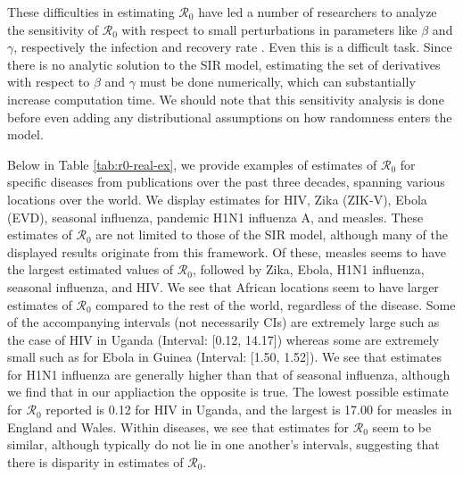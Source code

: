 \documentclass[12pt]{article}
\newcommand{\rr}{\ensuremath{\mathcal{R}_0}}
\begin{document}
These difficulties in estimating $\rr$ have led a number of researchers to analyze the sensitivity of $\rr$ with respect to small perturbations in parameters like $\beta$ and $\gamma$, respectively the infection and recovery rate \citep{lash2003,epstein2007agent,capaldi2012}.  Even this is a difficult task. Since there is no analytic solution to the SIR model, estimating the set of derivatives with respect to $\beta$ and $\gamma$ must be done numerically, which can substantially increase computation time.  We should note that this sensitivity analysis is done before even adding any distributional assumptions on how randomness enters the model.

Below in Table \ref{tab:r0-real-ex}, we provide examples of estimates of $\rr$ for specific diseases from publications over the past three decades, spanning various locations over the world.  We display estimates for HIV, Zika (ZIK-V), Ebola (EVD), seasonal influenza, pandemic H1N1 influenza A, and measles.  These estimates of $\rr$ are not limited to those of the SIR model, although many of the displayed results originate from this framework.  Of these, measles seems to have the largest estimated values of $\rr$, followed by Zika, Ebola, H1N1 influenza, seasonal influenza, and HIV.  We see that African locations seem to have larger estimates of $\rr$ compared to the rest of the world, regardless of the disease.  Some of the accompanying intervals (not necessarily CIs) are extremely large such as the case of HIV in Uganda (Interval: [0.12, 14.17]) whereas some are extremely small such as for Ebola in Guinea (Interval: [1.50, 1.52]).  We see that estimates for H1N1 influenza are generally higher than that of seasonal influenza, although we find that in our appliaction the opposite is true.  The lowest possible estimate for $\rr$ reported is 0.12 for HIV in Uganda, and the largest is 17.00 for measles in England and Wales.  Within diseases, we see that estimates for $\rr$ seem to be similar, although typically do not lie in one another's intervals, suggesting that there is disparity in estimates of $\rr$.
\end{document}

